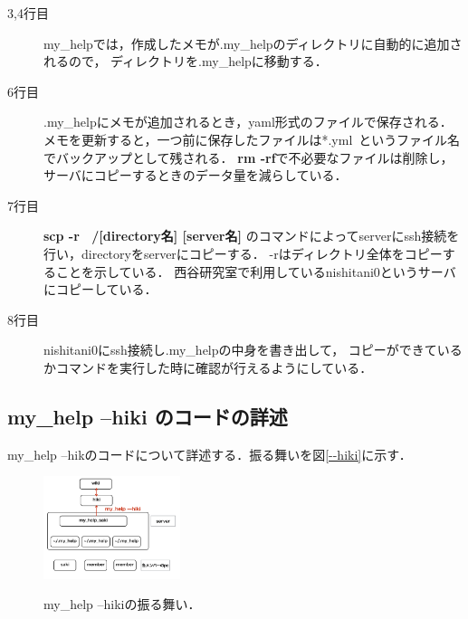\begin{description}
\item[3,4行目]
my\_helpでは，作成したメモが.my\_helpのディレクトリに自動的に追加されるので，
ディレクトリを.my\_helpに移動する．
\end{description}

\begin{description}
\item[6行目]
.my\_helpにメモが追加されるとき，yaml形式のファイルで保存される．
メモを更新すると，一つ前に保存したファイルは*.yml~というファイル名
でバックアップとして残される．
\textbf{rm -rf}で不必要なファイルは削除し，サーバにコピーするときのデータ量を減らしている．
\end{description}

\begin{description}
\item[7行目]
\textbf{scp -r ~/[directory名] [server名]}
のコマンドによってserverにssh接続を行い，directoryをserverにコピーする．
-rはディレクトリ全体をコピーすることを示している．
西谷研究室で利用しているnishitani0というサーバにコピーしている．
\end{description}

\begin{description}
\item[8行目]
nishitani0にssh接続し.my\_helpの中身を書き出して，
コピーができているかコマンドを実行した時に確認が行えるようにしている．
\end{description}

\subsection{my\_help --hiki のコードの詳述}
my\_help --hikのコードについて詳述する．振る舞いを図\ref{--hiki}に示す．

\begin{figure}[htbp]\begin{center}
\includegraphics[width=4cm,bb=100 100 600 900]{my_help2hiki_saki.013.png}
\caption{my\_help --hikiの振る舞い．}\label{--hiki}
\label{default}\end{center}\end{figure}

